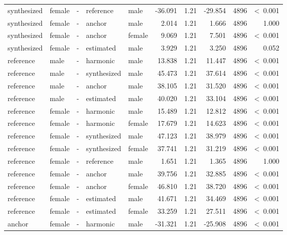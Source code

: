 \documentclass[a4paper,man,hidelinks,floatsintext]{apa7}
\begin{document}
\begin{table}[!htbp]
\begin{adjustbox}{max size={\columnwidth}{\textheight}}
\begin{tabular}{llrllrrrrr}
synthesized & female & - & reference   & male   &    -36.091 & 1.21 & -29.854 & 4896 &  \textless~0.001 \\
synthesized & female & - & anchor      & male   &      2.014 & 1.21 &   1.666 & 4896 &            1.000 \\
synthesized & female & - & anchor      & female &      9.069 & 1.21 &   7.501 & 4896 &  \textless~0.001 \\
synthesized & female & - & estimated   & male   &      3.929 & 1.21 &   3.250 & 4896 &            0.052 \\
reference   & male   & - & harmonic    & male   &     13.838 & 1.21 &  11.447 & 4896 &  \textless~0.001 \\
reference   & male   & - & synthesized & male   &     45.473 & 1.21 &  37.614 & 4896 &  \textless~0.001 \\
reference   & male   & - & anchor      & male   &     38.105 & 1.21 &  31.520 & 4896 &  \textless~0.001 \\
reference   & male   & - & estimated   & male   &     40.020 & 1.21 &  33.104 & 4896 &  \textless~0.001 \\
reference   & female & - & harmonic    & male   &     15.489 & 1.21 &  12.812 & 4896 &  \textless~0.001 \\
reference   & female & - & harmonic    & female &     17.679 & 1.21 &  14.623 & 4896 &  \textless~0.001 \\
reference   & female & - & synthesized & male   &     47.123 & 1.21 &  38.979 & 4896 &  \textless~0.001 \\
reference   & female & - & synthesized & female &     37.741 & 1.21 &  31.219 & 4896 &  \textless~0.001 \\
reference   & female & - & reference   & male   &      1.651 & 1.21 &   1.365 & 4896 &            1.000 \\
reference   & female & - & anchor      & male   &     39.756 & 1.21 &  32.885 & 4896 &  \textless~0.001 \\
reference   & female & - & anchor      & female &     46.810 & 1.21 &  38.720 & 4896 &  \textless~0.001 \\
reference   & female & - & estimated   & male   &     41.671 & 1.21 &  34.469 & 4896 &  \textless~0.001 \\
reference   & female & - & estimated   & female &     33.259 & 1.21 &  27.511 & 4896 &  \textless~0.001 \\
anchor      & female & - & harmonic    & male   &    -31.321 & 1.21 & -25.908 & 4896 &  \textless~0.001 \\

\end{tabular}
\end{adjustbox}
\end{table}
\end{document}
